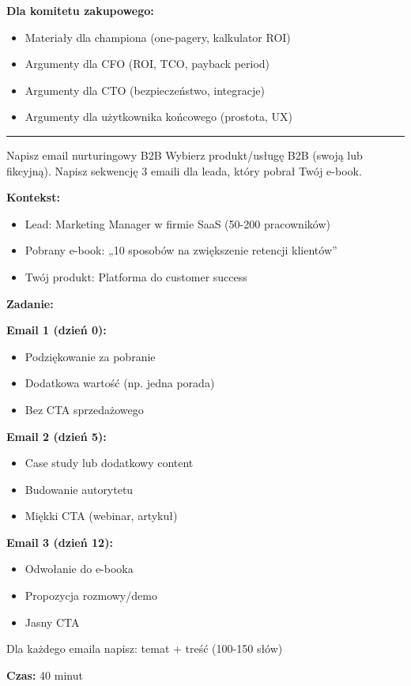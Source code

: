 \documentclass[
  12pt,
  a4paper,
  twoside,
  openright,
  12pt,
  DIV=12,
  BCOR=12mm]{scrbook}
\providecommand{\tightlist}{%
  \setlength{\itemsep}{0pt}\setlength{\parskip}{0pt}}\usepackage{longtable,booktabs,array}
\newcommand{\decoline}{%
  \begin{center}
    \textcolor{bordergray}{\rule{0.3\textwidth}{0.5pt}}
  \end{center}
}
\begin{document}
\textbf{Dla komitetu zakupowego:}

\begin{itemize}
\tightlist
\item[$\square$]
  Materiały dla championa (one-pagery, kalkulator ROI)
\item[$\square$]
  Argumenty dla CFO (ROI, TCO, payback period)
\item[$\square$]
  Argumenty dla CTO (bezpieczeństwo, integracje)
\item[$\square$]
  Argumenty dla użytkownika końcowego (prostota, UX)
\end{itemize}

\decoline

\begin{cwiczenie}{Napisz email nurturingowy B2B}
Wybierz produkt/usługę B2B (swoją lub fikcyjną). Napisz sekwencję 3 emaili dla leada, który pobrał Twój e-book.

\textbf{Kontekst:}
\begin{itemize}
  \item Lead: Marketing Manager w firmie SaaS (50-200 pracowników)
  \item Pobrany e-book: „10 sposobów na zwiększenie retencji klientów”
  \item Twój produkt: Platforma do customer success
\end{itemize}

\textbf{Zadanie:}

\textbf{Email 1 (dzień 0):}
\begin{itemize}
  \item Podziękowanie za pobranie
  \item Dodatkowa wartość (np. jedna porada)
  \item Bez CTA sprzedażowego
\end{itemize}

\textbf{Email 2 (dzień 5):}
\begin{itemize}
  \item Case study lub dodatkowy content
  \item Budowanie autorytetu
  \item Miękki CTA (webinar, artykuł)
\end{itemize}

\textbf{Email 3 (dzień 12):}
\begin{itemize}
  \item Odwołanie do e-booka
  \item Propozycja rozmowy/demo
  \item Jasny CTA
\end{itemize}

Dla każdego emaila napisz: temat + treść (100-150 słów)

\textbf{Czas:} 40 minut
\end{cwiczenie}
\end{document}
